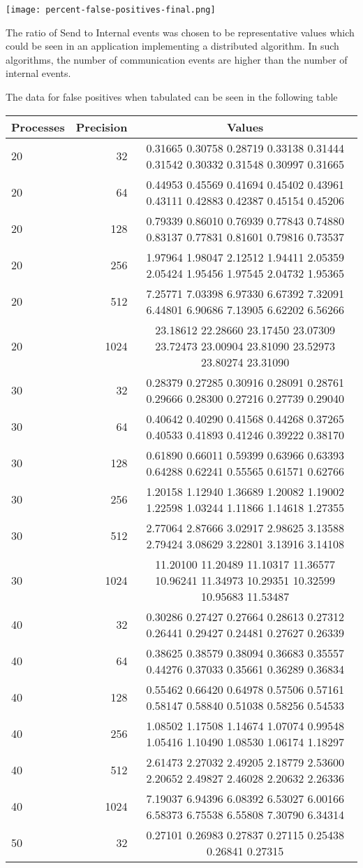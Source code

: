 \documentclass[]{article}
\begin{document}
\texttt{[image: percent-false-positives-final.png]}

The ratio of Send to Internal events was chosen to be representative
values which could be seen in an application implementing a distributed
algorithm. In such algorithms, the number of communication events are
higher than the number of internal events.

The data for false positives when tabulated can be seen in the following
table

\begin{longtable}[]{@{}lrc@{}}
\toprule
Processes & Precision & Values\tabularnewline
\midrule
\endhead
20 & 32 & 0.31665 0.30758 0.28719 0.33138 0.31444 0.31542 0.30332
0.31548 0.30997 0.31665\tabularnewline
20 & 64 & 0.44953 0.45569 0.41694 0.45402 0.43961 0.43111 0.42883
0.42387 0.45154 0.45206\tabularnewline
20 & 128 & 0.79339 0.86010 0.76939 0.77843 0.74880 0.83137 0.77831
0.81601 0.79816 0.73537\tabularnewline
20 & 256 & 1.97964 1.98047 2.12512 1.94411 2.05359 2.05424 1.95456
1.97545 2.04732 1.95365\tabularnewline
20 & 512 & 7.25771 7.03398 6.97330 6.67392 7.32091 6.44801 6.90686
7.13905 6.62202 6.56266\tabularnewline
20 & 1024 & 23.18612 22.28660 23.17450 23.07309 23.72473 23.00904
23.81090 23.52973 23.80274 23.31090\tabularnewline
30 & 32 & 0.28379 0.27285 0.30916 0.28091 0.28761 0.29666 0.28300
0.27216 0.27739 0.29040\tabularnewline
30 & 64 & 0.40642 0.40290 0.41568 0.44268 0.37265 0.40533 0.41893
0.41246 0.39222 0.38170\tabularnewline
30 & 128 & 0.61890 0.66011 0.59399 0.63966 0.63393 0.64288 0.62241
0.55565 0.61571 0.62766\tabularnewline
30 & 256 & 1.20158 1.12940 1.36689 1.20082 1.19002 1.22598 1.03244
1.11866 1.14618 1.27355\tabularnewline
30 & 512 & 2.77064 2.87666 3.02917 2.98625 3.13588 2.79424 3.08629
3.22801 3.13916 3.14108\tabularnewline
30 & 1024 & 11.20100 11.20489 11.10317 11.36577 10.96241 11.34973
10.29351 10.32599 10.95683 11.53487\tabularnewline
40 & 32 & 0.30286 0.27427 0.27664 0.28613 0.27312 0.26441 0.29427
0.24481 0.27627 0.26339\tabularnewline
40 & 64 & 0.38625 0.38579 0.38094 0.36683 0.35557 0.44276 0.37033
0.35661 0.36289 0.36834\tabularnewline
40 & 128 & 0.55462 0.66420 0.64978 0.57506 0.57161 0.58147 0.58840
0.51038 0.58256 0.54533\tabularnewline
40 & 256 & 1.08502 1.17508 1.14674 1.07074 0.99548 1.05416 1.10490
1.08530 1.06174 1.18297\tabularnewline
40 & 512 & 2.61473 2.27032 2.49205 2.18779 2.53600 2.20652 2.49827
2.46028 2.20632 2.26336\tabularnewline
40 & 1024 & 7.19037 6.94396 6.08392 6.53027 6.00166 6.58373 6.75538
6.55808 7.30790 6.34314\tabularnewline
50 & 32 & 0.27101 0.26983 0.27837 0.27115 0.25438 0.26841 0.27315

\end{longtable}
\end{document}
